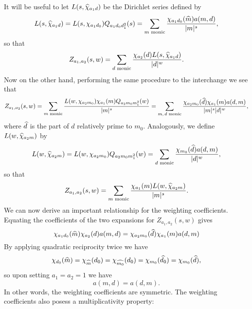 \documentclass[12pt,reqno,oneside]{amsart}
\begin{document}
    It will be useful to let $L(s,\widehat{\chi}_{a_{1}d})$ be the Dirichlet series defined by
    \[
        L(s,\widehat{\chi}_{a_{1}d}) = L(s,\chi_{a_{1}d_{0}})Q_{a_{1}d_{0}d_{1}^{2}}(s) = \sum_{\text{$m$ monic}}\frac{\chi_{a_{1}d_{0}}(\widehat{m})a(m,d)}{|m|^{s}},
    \]
    so that
    \[
        Z_{a_{1},a_{2}}(s,w) = \sum_{\text{$d$ monic}}\frac{\chi_{a_{2}}(d)L(s,\widehat{\chi}_{a_{1}d})}{|d|^{w}}.
    \]
     Now on the other hand, performing the same procedure to the interchange we see that
    \[
        Z_{a_{1},a_{2}}(s,w) = \sum_{\text{$m$ monic}}\frac{L(w,\chi_{a_{2}m_{0}})\chi_{a_{1}}(m)Q_{a_{2}m_{0}m_{1}^{2}}(w)}{|m|^{s}} = \sum_{\text{$m,d$ monic}}\frac{\chi_{a_{2}m_{0}}(\widehat{d})\chi_{a_{1}}(m)a(d,m)}{|m|^{s}|d|^{w}},
    \]
    where $\widehat{d}$ is the part of $d$ relatively prime to $m_{0}$. Analogously, we define $L(w,\widehat{\chi}_{a_{2}m})$ by
    \[
        L(w,\widehat{\chi}_{a_{2}m}) = L(w,\chi_{a_{2}m_{0}})Q_{a_{2}m_{0}m_{1}^{2}}(w) = \sum_{\text{$d$ monic}}\frac{\chi_{m_{0}}(\widehat{d})a(d,m)}{|d|^{w}},
    \]
    so that
    \[
        Z_{a_{1},a_{2}}(s,w) = \sum_{\text{$m$ monic}}\frac{\chi_{a_{1}}(m)L(w,\widehat{\chi}_{a_{2}m})}{|m|^{s}}.
    \]
    We can now derive an important relationship for the weighting coefficients. Equating the coefficients of the two expansions for $Z_{a_{1},a_{2}}(s,w)$ gives
    \[
        \chi_{a_{1}d_{0}}(\widehat{m})\chi_{a_{2}}(d)a(m,d) = \chi_{a_{2}m_{0}}(\widehat{d})\chi_{a_{1}}(m)a(d,m)
    \]
    By applying quadratic reciprocity twice we have
    \[
        \chi_{d_{0}}(\widehat{m}) = \chi_{\widehat{m}}(d_{0}) = \chi_{\widehat{m_{0}}}(d_{0}) = \chi_{m_{0}}(\widehat{d_{0}}) = \chi_{m_{0}}(\widehat{d}),
    \]
    so upon setting $a_{1} = a_{2} = 1$ we have
    \[
        a(m,d) = a(d,m).
    \]
    In other words, the weighting coefficients are symmetric. The weighting coefficients also posess a multiplicativity property:
\end{document}

